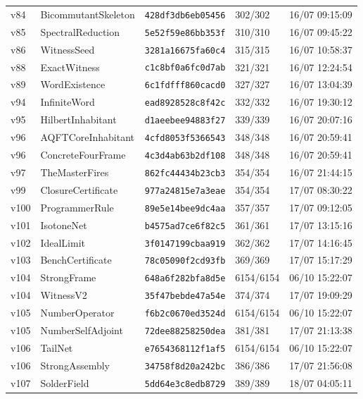 \documentclass[11pt]{article}
\theoremstyle{definition}\newtheorem{deriv}{Derivation}
\begin{document}
{\begin{longtable}{@{}lllll@{}}
v84 & BicommutantSkeleton & \texttt{428df3db6eb05456} & 302/302 & 16/07 09:15:09 \\
v85 & SpectralReduction & \texttt{5e52f59e86bb353f} & 310/310 & 16/07 09:45:22 \\
v86 & WitnessSeed & \texttt{3281a16675fa60c4} & 315/315 & 16/07 10:58:37 \\
v88 & ExactWitness & \texttt{c1c8bf0a6fc0d7ab} & 321/321 & 16/07 12:24:54 \\
v89 & WordExistence & \texttt{6c1fdfff860cacd0} & 327/327 & 16/07 13:04:39 \\
v94 & InfiniteWord & \texttt{ead8928528c8f42c} & 332/332 & 16/07 19:30:12 \\
v95 & HilbertInhabitant & \texttt{d1aeebee94883f27} & 339/339 & 16/07 20:07:16 \\
v96 & AQFTCoreInhabitant & \texttt{4cfd8053f5366543} & 348/348 & 16/07 20:59:41 \\
v96 & ConcreteFourFrame & \texttt{4c3d4ab63b2df108} & 348/348 & 16/07 20:59:41 \\
v97 & TheMasterFires & \texttt{862fc44434b23cb3} & 354/354 & 16/07 21:44:15 \\
v99 & ClosureCertificate & \texttt{977a24815e7a3eae} & 354/354 & 17/07 08:30:22 \\
v100 & ProgrammerRule & \texttt{89e5e14bee9dc4aa} & 357/357 & 17/07 09:12:05 \\
v101 & IsotoneNet & \texttt{b4575ad7ce6f82c5} & 361/361 & 17/07 13:15:16 \\
v102 & IdealLimit & \texttt{3f0147199cbaa919} & 362/362 & 17/07 14:16:45 \\
v103 & BenchCertificate & \texttt{78c05090f2cd93fb} & 369/369 & 17/07 15:17:29 \\
v104 & StrongFrame & \texttt{648a6f282bfa8d5e} & 6154/6154 & 06/10 15:22:07 \\
v104 & WitnessV2 & \texttt{35f47bebde47a54e} & 374/374 & 17/07 19:09:29 \\
v105 & NumberOperator & \texttt{f6b2c0670ed3524d} & 6154/6154 & 06/10 15:22:07 \\
v105 & NumberSelfAdjoint & \texttt{72dee88258250dea} & 381/381 & 17/07 21:13:38 \\
v106 & TailNet & \texttt{e7654368112f1af5} & 6154/6154 & 06/10 15:22:07 \\
v106 & StrongAssembly & \texttt{34758f8d20a242bc} & 386/386 & 17/07 21:56:08 \\
v107 & SolderField & \texttt{5dd64e3c8edb8729} & 389/389 & 18/07 04:05:11 \\

\end{longtable}}
\end{document}
